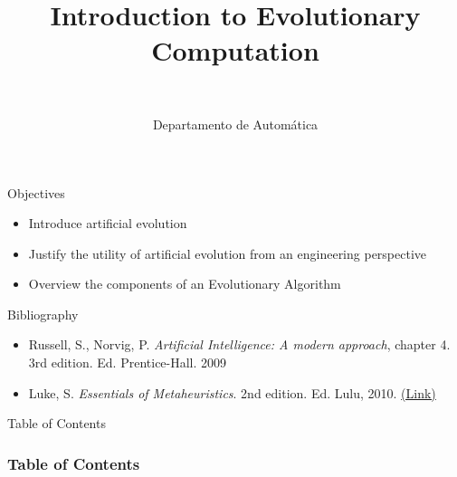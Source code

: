 \documentclass[10pt,compress]{beamer} %
\title[Introduction to Evolutionary Computation]{Introduction to Evolutionary Computation}
\author{\asignatura\\\carrera}
\institute{}
\date{Departamento de Automática}
\begin{document}
{\titlepageBlue
    \begin{frame}
        \titlepage
    \end{frame}
}

\institute{\asignatura}

\begin{frame}[plain]{}
   \begin{block}{Objectives}
       \begin{itemize}
        \item Introduce artificial evolution
	\item Justify the utility of artificial evolution from an engineering perspective
	\item Overview the components of an Evolutionary Algorithm
       \end{itemize}
   \end{block}

   \begin{block}{Bibliography}
   		\begin{itemize}
	    \item Russell, S., Norvig, P. \textit{Artificial Intelligence: A modern approach}, chapter 4. 3rd edition. Ed. Prentice-Hall. 2009
     	\item Luke, S. \emph{Essentials of Metaheuristics}. 2nd edition. Ed. Lulu, 2010. \href{https://cs.gmu.edu/~sean/book/metaheuristics/Essentials.pdf}{(Link)}
   		\end{itemize}
   \end{block}
\end{frame}

{
\begin{frame}[shrink]{Table of Contents}
 \frametitle{Table of Contents}

    \begin{multicols}{2}
    \tableofcontents
    \end{multicols}
\end{frame}
}


\end{document}
